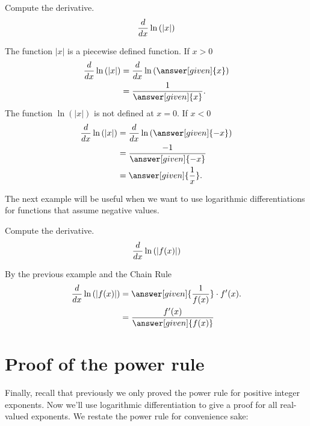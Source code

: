 \documentclass{ximera}
\begin{document}
\begin{example}
Compute the derivative.
\[
\frac{d}{\mathop{}\!d x}\ln{(|x|)}
\]
\begin{explanation}
The function $|x|$ is a piecewise defined function.  If $x>0$
\begin{align*}
\ddx\ln{(|x|)} &= \ddx\ln{(\answer[given]{x})}\\
&=\frac{1}{\answer[given]{x}}.
\end{align*}
The function $\ln{(|x|)}$ is not defined at $x=0$.  If $x<0$
\begin{align*}
\ddx\ln{(|x|)} &= \ddx\ln{(\answer[given]{-x})}\\
&=\frac{-1}{\answer[given]{-x}}\\
&=\answer[given]{\frac{1}{x}}.
\end{align*}
\end{explanation}
\end{example}

The next  example will be useful when we want to use logarithmic differentiations for functions that  assume negative values. 


\begin{example}
Compute the derivative.
\[
\frac{d}{\mathop{}\!d x}\ln{(|f(x)|)}
\]
\begin{explanation}
By the previous example and the Chain Rule
\begin{align*}
\ddx\ln{(|f(x)|)} &=\answer[given]{\frac{1}{f(x)}}\cdot f'(x).\\
&=\frac{f'(x)}{\answer[given]{f(x)}}
\end{align*}
\end{explanation}
\end{example}


\section{Proof of the power rule}


Finally, recall that previously we only proved the power rule for
positive integer exponents. Now we'll use logarithmic differentiation to give
a proof for all real-valued exponents. We restate the power rule
for convenience sake:
\end{document}
